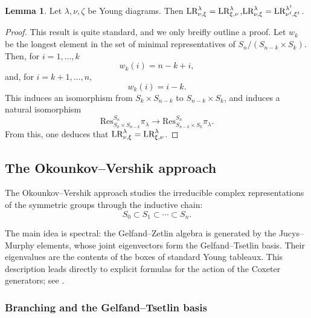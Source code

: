 \documentclass[11pt]{amsart}
\numberwithin{equation}{section}
\theoremstyle{definition}
\newtheorem{lemma}[thm]{Lemma}
\begin{document}
\begin{lemma}\label{lem: sym of LR}
Let \( \lambda, \nu, \zeta\) be Young diagrams. Then
$\textnormal{LR}^{\lambda}_{\nu,\xi}=\textnormal{LR}^{\lambda}_{\xi,\nu}$,\quad $\textnormal{LR}^{\lambda}_{\nu,\xi}=\textnormal{LR}^{\lambda^{t}}_{\nu^{t},\xi^{t}}$.
\end{lemma}

\begin{proof}
This result is quite standard, and we only breifly outline a proof. Let \( w_k \) be the longest element in the set of minimal representatives of \( S_n/(S_{n-k}\times S_k)\). Then, for \(i=1, \ldots, k\)
\[  w_k(i)=n-k+i , 
\]
and, for \(i=k+1, \ldots, n\),
\[  w_k(i) = i-k . \]
This induces an isomorphism from \(S_k \times S_{n-k}\) to \(S_{n-k}\times S_k\), and induces a natural isomorphism
\[  \mathrm{Res}^{S_n}_{S_k \times S_{n-k}}\pi_{\lambda} \rightarrow \mathrm{Res}^{S_n}_{S_{n-k}\times S_k}\pi_{\lambda} .
\]
From this, one deduces that $\textnormal{LR}^{\lambda}_{\nu,\xi}=\textnormal{LR}^{\lambda}_{\xi,\nu}$.
\end{proof}



\subsection{The Okounkov–Vershik approach} \label{ss ov approach}

The Okounkov--Vershik approach studies the irreducible complex
representations of the symmetric groups through the inductive chain:
\begin{equation*}
    S_{0}\subset S_{1}\subset\cdots\subset S_{n}.
\end{equation*}

The main idea is spectral: the Gelfand–Zetlin algebra is generated by the
Jucys--Murphy elements, whose joint eigenvectors form the
Gelfand--Tsetlin basis.  Their eigenvalues are the contents of the boxes of
standard Young tableaux.  This description leads directly to explicit
formulas for the action of the Coxeter generators; see
\cite{okounkov1996new,vershik2005new,ceccherini2010representation}.

 
\subsubsection{Branching and the Gelfand--Tsetlin basis} \label{sss gt basis}
\end{document}
